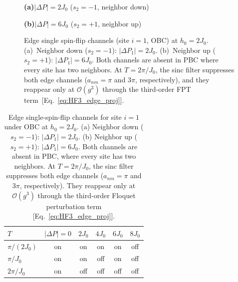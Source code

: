 \documentclass[aps,prb,reprint,twocolumn,amsmath,amssymb,citeautoscript]{revtex4-2}
\begin{document}
\begin{figure}[t]
\centering

\textbf{(a)}\;$|\Delta P|=2J_0$\quad
($s_2=-1$, neighbor down)\\[4pt]

\vspace{6pt}

\textbf{(b)}\;$|\Delta P|=6J_0$\quad
($s_2=+1$, neighbor up)\\[4pt]

\caption{Edge single spin-flip channels (site $i=1$, OBC) at
$h_0=2J_0$.
(a)~Neighbor down ($s_2=-1$): $|\Delta P_1|=2J_0$.
(b)~Neighbor up ($s_2=+1$): $|\Delta P_1|=6J_0$.
Both channels are absent in PBC where every site has two neighbors.
At $T=2\pi/J_0$, the sinc filter suppresses both edge channels
($a_{nm}=\pi$ and $3\pi$, respectively), and they reappear only at
$\mathcal{O}(g^3)$ through the third-order FPT term~[Eq.~\eqref{eq:HF3_edge_proj}].}
\label{fig:edge_flips}
\end{figure}
\begin{table}[b]
\caption{Edge single-spin-flip channels for site $i=1$ under OBC at
$h_0=2J_0$.
(a) Neighbor down ($s_2=-1$): $|\Delta P_1|=2J_0$.
(b) Neighbor up ($s_2=+1$): $|\Delta P_1|=6J_0$.
Both channels are absent in PBC, where every site has two neighbors.
At $T=2\pi/J_0$, the sinc filter suppresses both edge channels
($a_{nm}=\pi$ and $3\pi$, respectively). They reappear only at
$\mathcal{O}(g^3)$ through the third-order Floquet perturbation term
[Eq.~\eqref{eq:HF3_edge_proj}].}
\label{tab:sinc_OBC}
\begin{ruledtabular}
\begin{tabular}{lccccc}
$T$ & $|\Delta P|=0$ & $2J_0$ & $4J_0$ & $6J_0$ & $8J_0$ \\
\hline
$\pi/(2J_0)$ & on & on & on & on & off \\
$\pi/J_0$    & on & on & off & on & off \\
$2\pi/J_0$   & on & off & off & off & off \\
\end{tabular}
\end{ruledtabular}
\end{table}
\end{document}
